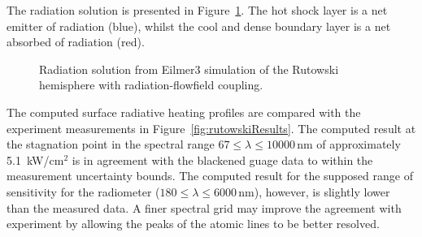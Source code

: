 The radiation solution is presented in Figure~\ref{fig:rutowskiRadiation}.
The hot shock layer is a net emitter of radiation (blue), whilst the cool and dense boundary layer is a net absorbed of radiation (red).

\begin{figure}
 \centering
 \caption{Radiation solution from Eilmer3 simulation of the Rutowski hemisphere with radiation-flowfield coupling.}
  \label{fig:rutowskiRadiation}
\end{figure}

The computed surface radiative heating profiles are compared with the experiment measurements in Figure~\ref{fig:rutowskiResults}.
The computed result at the stagnation point in the spectral range $67 \leq \lambda \leq 10000$\,nm of approximately 5.1~kW/cm$^2$ is in agreement with the blackened guage data to within the measurement uncertainty bounds.
The computed result for the supposed range of sensitivity for the radiometer ($180 \leq \lambda \leq 6000$\,nm), however, is slightly lower than the measured data.
A finer spectral grid may improve the agreement with experiment by allowing the peaks of the atomic lines to be better resolved.

